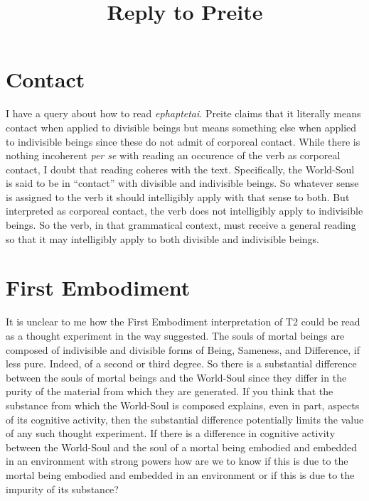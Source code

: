\documentclass[12pt]{article}
\title{Reply to Preite}
\author{\myauthor}
\date{} %
\begin{document}
\maketitle
%

\setlength{\parindent}{1em}


\section{Contact} %
\label{sec:contact}

I have a query about how to read \emph{ephaptetai}. Preite claims that it literally means contact when applied to divisible beings but means something else when applied to indivisible beings since these do not admit of corporeal contact. While there is nothing incoherent \emph{per se} with reading an occurence of the verb as corporeal contact, I doubt that reading coheres with the text. Specifically, the World-Soul is said to be in ``contact'' with divisible and indivisible beings. So whatever sense is assigned to the verb it should intelligibly apply with that sense to both. But interpreted as corporeal contact, the verb does not intelligibly apply to indivisible beings. So the verb, in that grammatical context, must receive a general reading so that it may intelligibly apply to both divisible and indivisible beings.


\section{First Embodiment} %
\label{sec:first_embodiment}

It is unclear to me how the First Embodiment interpretation of T2 could be read as a thought experiment in the way suggested. The souls of mortal beings are composed of indivisible and divisible forms of Being, Sameness, and Difference, if less pure. Indeed, of a second or third degree. So there is a substantial difference between the souls of mortal beings and the World-Soul since they differ in the purity of the material from which they are generated. If you think that the substance from which the World-Soul is composed explains, even in part, aspects of its cognitive activity, then the substantial difference potentially limits the value of any such thought experiment. If there is a difference in cognitive activity between the World-Soul and the soul of a mortal being embodied and embedded in an environment with strong powers how are we to know if this is due to the mortal being embodied and embedded in an environment or if this is due to the impurity of its substance? 
\end{document}
